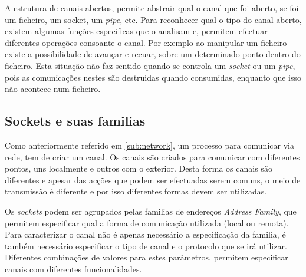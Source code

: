 A estrutura de canais abertos, permite abstrair qual o canal que foi aberto, se foi um ficheiro, um socket, um \textit{pipe}, etc.
Para reconhecer qual o tipo do canal aberto, existem algumas funções especificas que o analisam e, permitem efectuar diferentes operações consoante o canal.
Por exemplo ao manipular um ficheiro existe a possibilidade de avançar e recuar, sobre um determinado ponto dentro do ficheiro.
Esta situação não faz sentido quando se controla um \textit{socket} ou um \textit{pipe}, pois as comunicações nestes são destruidas quando consumidas, enquanto que isso não acontece num ficheiro.
 




\subsection{Sockets e suas familias}
\label{sub:sockets}

Como anteriormente referido em \ref{sub:network}, um processo para comunicar via rede, tem de criar um canal.
Os canais são criados para comunicar com diferentes pontos, uns localmente e outros com o exterior.
Desta forma os canais são diferentes e apesar das acções que podem ser efectuadas serem comuns, o meio de transmissão é diferente e por isso diferentes formas devem ser utilizadas.

Os \textit{sockets} podem ser agrupados pelas familias de endereços \textit{Address Family}, que permitem especificar qual a forma de comunicação utilizada (local ou remota).
Para caracterizar o canal não é apenas necessário a especificação da familia, é também necessário especificar o tipo de canal e o protocolo que se irá utilizar.
Diferentes combinações de valores para estes parâmetros, permitem especificar canais com diferentes funcionalidades.

